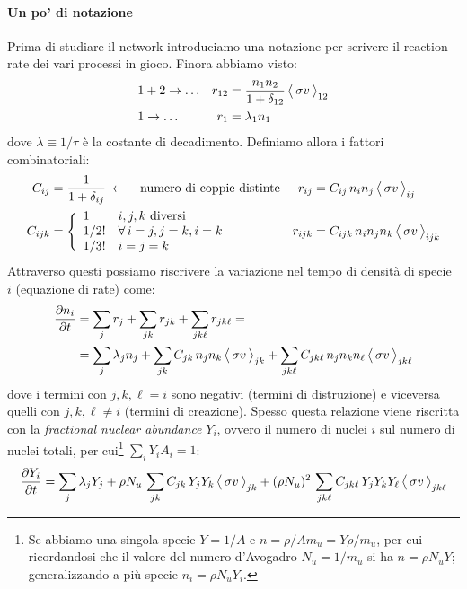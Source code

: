 \paragraph{Un po' di notazione} Prima di studiare il network introduciamo una notazione per scrivere il reaction rate dei vari processi in gioco. Finora abbiamo visto:
\begin{align*}
	&1+2 \to \dots	& r_{12} &= \frac{n_1n_2}{1+\delta_{12}}\,\bigl\langle\, \sigma v\, \bigr\rangle_{12} \\
	&1\to \dots	& r_1 &= \lambda_1 n_1
\end{align*}
\noindent dove $\lambda \equiv 1/\tau$ è la costante di decadimento. Definiamo allora i fattori combinatoriali:
\begin{align*}
	C_{ij} &= \frac{1}{1+\delta_{ij}}\:\longleftarrow \text{ numero di coppie distinte} & r_{ij} &= C_{ij}\, n_in_j\,\mean{\sigma v}_{ij} \\ 
	C_{ijk} &= \Biggl \{%
	\begin{array}{ll}
		1    & i,j,k \text{ diversi}\\
		1/2! & \forall\, i=j, j=k, i=k \\ 
		1/3! & i=j=k
	\end{array}%
	& r_{ijk} &= C_{ijk}\, n_in_j n_k\,\mean{\sigma v}_{ijk}
\end{align*}
\noindent Attraverso questi possiamo riscrivere la variazione nel tempo di densità di specie $i$ (equazione di rate) come:
\begin{align*}
	\frac{\partial n_i}{\partial t} &= \sum_j r_j + \sum_{jk} r_{jk} + \sum_{jk\ell}  r_{jk\ell} = \\
	&= \sum_j  \lambda_j n_j + \sum_{jk} C_{jk} \,n_jn_k\, \bigl\langle\, \sigma v\, \bigr\rangle_{jk} + \sum_{jk\ell} C_{jk\ell}\,n_jn_kn_\ell\,\bigl\langle\, \sigma v\, \bigr\rangle_{jk\ell}    
\end{align*} 
\noindent dove i termini con $j,k,\ell = i$ sono negativi (termini di distruzione) e viceversa quelli con $j,k,\ell \not = i$ (termini di creazione). Spesso questa relazione viene riscritta con la \textit{fractional nuclear abundance} $Y_i$, ovvero il numero di nuclei $i$ sul numero di nuclei totali, per cui\footnote{Se abbiamo una singola specie $Y=1/A$ e $n = \rho/Am_u = Y\rho/m_u$, per cui ricordandosi che il valore del numero d'Avogadro $N_u = 1/m_u$ si ha $n=\rho N_u Y$; generalizzando a più specie $n_i = \rho N_u Y_i$.} $\sum_i Y_i A_i = 1$:
$$\frac{\partial Y_i}{\partial t} = \sum_j \lambda_j Y_j + \rho N_u\, \sum_{jk} C_{jk}\,Y_jY_k\, \bigl\langle\, \sigma v\, \bigr\rangle_{jk} + (\rho N_u)^2\,\sum_{jk\ell} C_{jk\ell}\,Y_jY_kY_\ell\,\bigl\langle\, \sigma v\, \bigr\rangle_{jk\ell} $$


